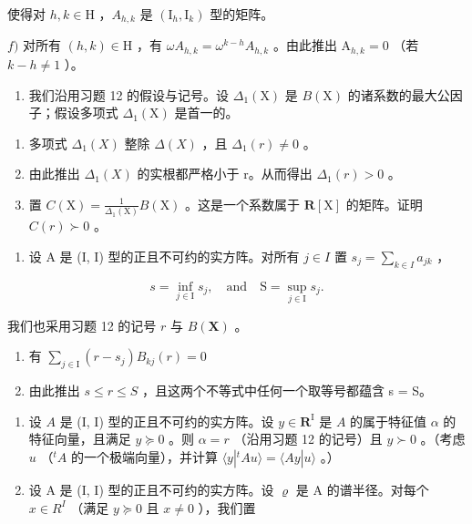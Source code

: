 使得对 \(h, k \in \mathrm{H}\) ，\(A_{h,k}\) 是 \((\mathrm{I}_h, \mathrm{I}_k)\) 型的矩阵。

\(f)\) 对所有 \((h,k)\in\mathrm{H}\) ，有 \(\omega A_{h,k}=\omega^{k-h}A_{h,k}\) 。由此推出 \(\mathrm{A}_{h,k}=0\) （若 \(k-h\neq1\) ）。

\begin{enumerate}
\def\labelenumi{\arabic{enumi})}
\setcounter{enumi}{14}
\tightlist
\item
  我们沿用习题 12 的假设与记号。设 \(\Delta_1(\mathrm{X})\) 是 \(B(\mathrm{X})\) 的诸系数的最大公因子；假设多项式 \(\Delta_1(\mathrm{X})\) 是首一的。
\end{enumerate}

\begin{enumerate}
\def\labelenumi{\alph{enumi})}
\item
  多项式 \(\Delta_1(X)\) 整除 \(\Delta(X)\) ，且 \(\Delta_1(r) \neq 0\) 。
\item
  由此推出 \(\Delta_{1}(X)\) 的实根都严格小于 r。从而得出 \(\Delta_{1}(r)>0\) 。
\item
  置 \(C(\mathrm{X}) = \frac{1}{\Delta_1(\mathrm{X})} B(\mathrm{X})\) 。这是一个系数属于 \(\mathbf{R}[\mathrm{X}]\) 的矩阵。证明 \(C(r) \succ 0\) 。
\end{enumerate}

\begin{enumerate}
\def\labelenumi{\arabic{enumi})}
\setcounter{enumi}{15}
\tightlist
\item
  设 A 是 (I, I) 型的正且不可约的实方阵。对所有 \(j \in I\) 置 \(s_{j} = \sum_{k \in I} a_{jk}\) ，
\end{enumerate}

\[
s = \inf _ {j \in \mathrm{I}} s _ {j}, \quad \text {and} \quad \mathrm{S} = \sup _ {j \in \mathrm{I}} s _ {j}.
\]

我们也采用习题 12 的记号 \(r\) 与 \(B(\mathbf{X})\) 。

\begin{enumerate}
\def\labelenumi{\alph{enumi})}
\item
  有 \(\sum_{j\in \mathrm{I}}(r - s_j)B_{kj}(r) = 0\)
\item
  由此推出 \(s \leqslant r \leqslant S\) ，且这两个不等式中任何一个取等号都蕴含 s = S。
\end{enumerate}

\begin{enumerate}
\def\labelenumi{\arabic{enumi})}
\setcounter{enumi}{16}
\item
  设 \(A\) 是 (I, I) 型的正且不可约的实方阵。设 \(y \in \mathbf{R}^{\mathrm{I}}\) 是 \(A\) 的属于特征值 \(\alpha\) 的特征向量，且满足 \(y \succcurlyeq 0\) 。则 \(\alpha = r\) （沿用习题 12 的记号）且 \(y \succ 0\) 。（考虑 \(u\) （\(^{t}A\) 的一个极端向量），并计算 \(\langle y|^{t}Au\rangle = \langle Ay|u\rangle\) 。）
\item
  设 A 是 (I, I) 型的正且不可约的实方阵。设 \(\varrho\) 是 A 的谱半径。对每个 \(x \in R^{I}\) （满足 \(y \succcurlyeq 0\) 且 \(x \neq 0\) ），我们置
\end{enumerate}

